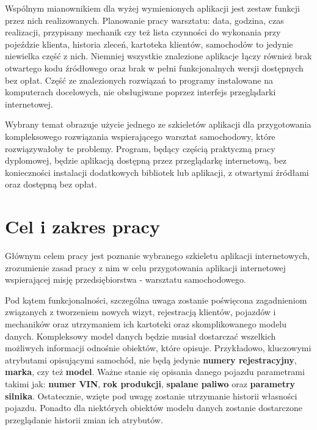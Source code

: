 	Wspólnym mianownikiem dla wyżej wymienionych aplikacji jest zestaw funkcji przez nich realizowanych. Planowanie pracy warsztatu: data, godzina, czas realizacji, przypisany mechanik czy też lista czynności do wykonania przy pojeździe klienta, historia zleceń, kartoteka klientów, samochodów to jedynie niewielka część z nich. Niemniej wszystkie znalezione aplikacje łączy również brak otwartego kodu źródłowego oraz brak w pełni funkcjonalnych wersji dostępnych bez opłat. Część ze znalezionych rozwiązań to programy instalowane na komputerach docelowych, nie obsługiwane poprzez interfejs przeglądarki internetowej.  
	
	Wybrany temat obrazuje użycie jednego ze szkieletów aplikacji dla przygotowania kompleksowego rozwiązania wspierającego warsztat samochodowy, które rozwiązywałoby te problemy. Program, będący częścią praktyczną pracy dyplomowej, będzie aplikacją dostępną przez przeglądarkę internetową, bez konieczności instalacji dodatkowych bibliotek lub aplikacji, z otwartymi źródłami oraz dostępną bez opłat. 

\section{Cel i zakres pracy}
	Głównym celem pracy jest poznanie wybranego szkieletu aplikacji internetowych, zrozumienie zasad pracy z nim w celu przygotowania aplikacji internetowej wspierającej misję przedsiębiorstwa - warsztatu samochodowego. 
	
	Pod kątem funkcjonalności, szczególna uwaga zostanie poświęcona zagadnieniom związanych z tworzeniem nowych wizyt, rejestracją klientów, pojazdów i mechaników oraz utrzymaniem ich kartoteki oraz skomplikowanego modelu danych. Kompleksowy model danych będzie musiał dostarczać wszelkich możliwych informacji odnośnie obiektów, które opisuje. Przykładowo, kluczowymi atrybutami opisującymi samochód, nie będą jedynie \textbf{numery rejestracyjny}, \textbf{marka}, czy też \textbf{model}. Ważne stanie się opisania danego pojazdu parametrami takimi jak: \textbf{numer VIN}, \textbf{rok produkcji}, \textbf{spalane paliwo} oraz \textbf{parametry silnika}. Ostatecznie, wzięte pod uwagę zostanie utrzymanie historii własności pojazdu. Ponadto dla niektórych obiektów modelu danych zostanie dostarczone przeglądanie historii zmian ich atrybutów. 
	
